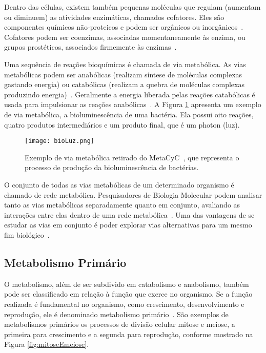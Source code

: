 \indent Dentro das células, existem também pequenas moléculas que regulam (aumentam ou diminuem) as atividades enzimáticas, chamados cofatores. Eles são componentes químicos não-proteicos e podem ser orgânicos ou inorgânicos~\cite{lacroixCTS08}. Cofatores podem ser coenzimas, associadas momentaneamente às enzima, ou grupos prostéticos, associados firmemente às enzimas~\cite{Cap2schomburg}.

\indent Uma sequência de reações bioquímicas é chamada de via metabólica. As vias metabólicas podem ser anabólicas (realizam síntese de moléculas complexas gastando energia) ou catabólicas (realizam a quebra de moléculas complexas produzindo energia)~\cite{lacroixCTS08}. Geralmente a energia liberada pelas reações catabólicas é usada para impulsionar as reações anabólicas~\cite{carterClass}. A Figura \ref{fig:bioLuz} apresenta um exemplo de via metabólica, a bioluminescência de uma bactéria. Ela possui oito reações, quatro produtos intermediários e um produto final, que é um photon (luz).

\begin{figure}[h]
    \centering
    \texttt{[image: bioLuz.png]}
    \caption{Exemplo de via metabólica retirado do MetaCyC~\cite{examplePathway}, que representa o processo de produção da bioluminescência de bactérias.}
    \label{fig:bioLuz}
\end{figure}

\indent O conjunto de todas as vias metabólicas de um determinado organismo é chamado de rede metabólica. Pesquisadores de Biologia Molecular podem analisar tanto as vias metabólicas separadamente quanto em conjunto, avaliando as interações entre elas dentro de uma rede metabólica~\cite{lacroixCTS08}. Uma das vantagens de se estudar as vias em conjunto é poder explorar vias alternativas para um mesmo fim biológico~\cite{lacroixCTS08}.

\subsection{Metabolismo Primário}

\indent O metabolismo, além de ser subdivido em catabolismo e anabolismo, também pode ser classificado em relação à função que exerce no organismo. Se a função realizada é fundamental no organismo, como crescimento, desenvolvimento e reprodução, ele é denominado metabolismo primário~\cite{Cap3schomburg}. São exemplos de metabolismos primários os processos de divisão celular mitose e meiose, a primeira para crescimento e a segunda para reprodução, conforme mostrado na Figura \ref{fig:mitoseEmeiose}.

